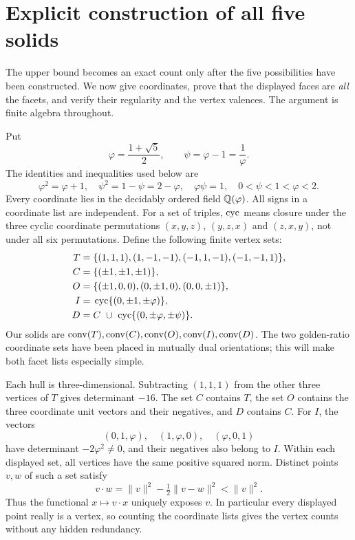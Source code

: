 \section{Explicit construction of all five solids}
\label{sec:existence}

The upper bound becomes an exact count only after the five possibilities
have been constructed.  We now give coordinates, prove that the displayed
faces are \emph{all} the facets, and verify their regularity and the vertex
valences.  The argument is finite algebra throughout.

Put
\[
 \varphi=\frac{1+\sqrt5}{2},\qquad
 \psi=\varphi-1=\frac1\varphi.
\]
The identities and inequalities used below are
\begin{equation}\label{eq:golden-identities}
 \varphi^2=\varphi+1,\quad
 \psi^2=1-\psi=2-\varphi,\quad
 \varphi\psi=1,\quad
 0<\psi<1<\varphi<2.
\end{equation}
Every coordinate lies in the decidably ordered field $\mathbb Q(\varphi)$.
All signs in a coordinate list are independent.  For a set of triples,
$\operatorname{cyc}$ means closure under the three cyclic coordinate permutations
$(x,y,z)$, $(y,z,x)$ and $(z,x,y)$, not under all six permutations.
Define the following finite vertex sets:
\begin{align*}
 T={}&\{(1,1,1),(1,-1,-1),(-1,1,-1),(-1,-1,1)\},\\
 C={}&\{(\pm1,\pm1,\pm1)\},\\
 O={}&\{(\pm1,0,0),(0,\pm1,0),(0,0,\pm1)\},\\
 I={}&\operatorname{cyc}\{(0,\pm1,\pm\varphi)\},\\
 D={}&C\ \cup\ \operatorname{cyc}\{(0,\pm\varphi,\pm\psi)\}.
\end{align*}
Our solids are $\operatorname{conv}(T),\operatorname{conv}(C),\operatorname{conv}(O),\operatorname{conv}(I),\operatorname{conv}(D)$.
The two golden-ratio coordinate sets have been placed in mutually dual
orientations; this will make both facet lists especially simple.

Each hull is three-dimensional.  Subtracting $(1,1,1)$ from the other
three vertices of $T$ gives determinant $-16$.  The set $C$ contains $T$,
the set $O$ contains the three coordinate unit vectors and their negatives,
and $D$ contains $C$.  For $I$, the vectors
\[
 (0,1,\varphi),\quad (1,\varphi,0),\quad (\varphi,0,1)
\]
have determinant $-2\varphi^2\ne0$, and their negatives also belong to $I$.
Within each displayed set, all vertices have the same positive squared
norm.  Distinct points $v,w$ of such a set satisfy
\[
 v\mathbin{\cdot}w
   =\lVert v\rVert^2-\tfrac12\lVert v-w\rVert^2
   <\lVert v\rVert^2.
\]
Thus the functional $x\mapsto v\cdot x$ uniquely exposes $v$.
In particular every displayed point really is a vertex, so counting the
coordinate lists gives the vertex counts without any hidden redundancy.

